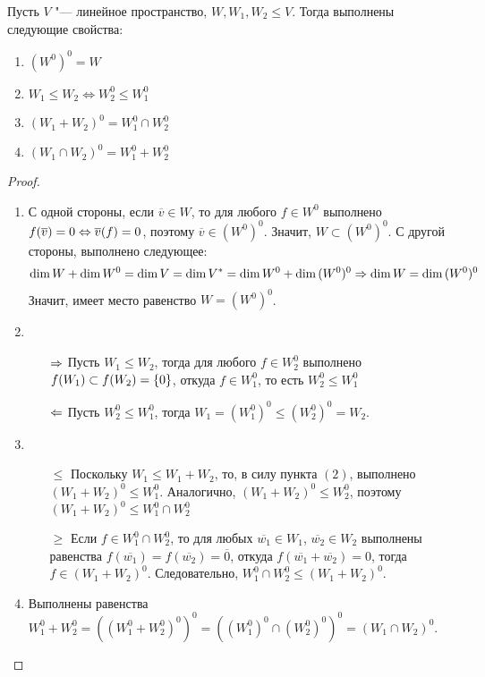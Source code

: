 \begin{theorem}
	Пусть $V$ "--- линейное пространство, $W, W_1, W_2 \le V$. Тогда выполнены следующие свойства:
	\begin{enumerate}
		\item $(W^0)^0 = W$
		\item $W_1 \le W_2 \Leftrightarrow W_2^0 \le W_1^0$
		\item $(W_1 + W_2)^0 = W_1^0 \cap W_2^0$
		\item $(W_1 \cap W_2)^0 = W_1^0 + W_2^0$
	\end{enumerate}
\end{theorem}

\begin{proof}~
	\begin{enumerate}
		\item С одной стороны, если $\overline{v} \in W$, то для любого $f \in W^0$ выполнено $f(\overline{v}) = 0 \Leftrightarrow \overline{v}(f) = 0$, поэтому $\overline{v} \in (W^0)^0$. Значит, $W \subset (W^0)^0$. С другой стороны, выполнено следующее:
		\[\dim{W} + \dim{W^0} \hm{=} \dim{V} = \dim{V^*} = \dim{W^0} + \dim{(W^0)^0} \ra \dim{W} = \dim{(W^0)^0}\]
		Значит, имеет место равенство $W = (W^0)^0$.
		
		\item
		\begin{itemize}
			\item[$\Rightarrow$] Пусть $W_1 \le W_2$, тогда для любого $f \in W_2^0$ выполнено $f(W_1) \hm{\subset} f(W_2) = \{0\}$, откуда $f \in W_1^0$, то есть $W_2^0 \le W_1^0$
			\item[$\Leftarrow$] Пусть $W_2^0 \le W_1^0$, тогда $W_1 = (W_1^0 )^0 \le (W_2^0)^0 = W_2$.
		\end{itemize}
	
		\item
		\begin{itemize}
			\item[$\le$] Поскольку $W_1 \le W_1 + W_2$, то, в силу пункта $(2)$, выполнено $(W_1 + W_2)^0 \le W_1^0$. Аналогично, $(W_1 + W_2)^0 \le W_2^0$, поэтому $(W_1 + W_2)^0 \le W_1^0 \cap W_2^0$
			\item[$\ge$] Если $f \in W_1^0 \cap W_2^0$, то для любых $\overline{w_1} \in W_1$, $\overline{w_2} \in W_2$ выполнены равенства $f(\overline{w_1}) = f(\overline{w_2}) = \overline{0}$, откуда $f(\overline{w_1} + \overline{w_2}) = 0$, тогда $f \in (W_1 + W_2)^0$. Следовательно, $W_1^0 \cap W_2^0 \le (W_1 + W_2)^0$.
		\end{itemize}
	
		\item Выполнены равенства $W_1^0 + W_2^0 = ((W_1^0 + W_2^0)^0)^0 = ((W_1^0)^0 \cap (W_2^0)^0)^0 = (W_1 \cap W_2)^0$.\qedhere
	\end{enumerate}
\end{proof}


